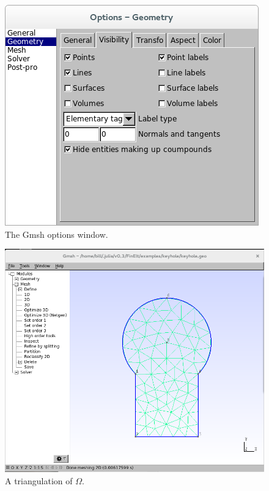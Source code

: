 \documentclass[a4paper,12pt]{article}
\begin{document}
\begin{figure}
\caption{The Gmsh options window.}
\label{fig: options}
\begin{center}
\includegraphics[scale=0.4]{images/options.png}
\end{center}
\end{figure}

\begin{figure}
\caption{A triangulation of $\Omega$.}
\label{fig: triangulation}
\begin{center}
\includegraphics[scale=0.3]{images/triangulation.png}
\end{center}
\end{figure}
\end{document}
